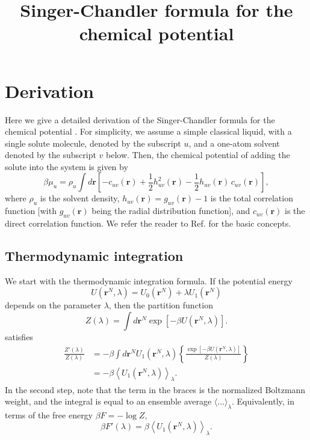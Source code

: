\documentclass{article}
\begin{document}
\newcommand{\vct}[1]{\mathbf{#1}}
\newcommand{\vr}{\vct{r}}
\newcommand{\vrN}{\mathbf{r}^N}
\newcommand{\vrn}{\mathbf{r}^n}
\newcommand{\plam}{\partial_\lambda}



\title{Singer-Chandler formula for the chemical potential}
\date{}
\maketitle



\section{Derivation}

Here we give a detailed derivation of the Singer-Chandler formula
  for the chemical potential \cite{singer}.
For simplicity, we assume a simple classical liquid,
  with a single solute molecule, denoted by the subscript $u$,
  and a one-atom solvent denoted by the subscript $v$ below.
Then, the chemical potential of adding the solute into
  the system is given by
%
\begin{equation}
\beta \mu_u
  =
  \rho_u \int d\vr
  \left[
    - c_{uv}(\vr)
    + \frac{1}{2} h_{uv}^2(\vr)
    - \frac{1}{2} h_{uv}(\vr) \, c_{uv}(\vr)
  \right],
  \label{eq:singer}
\end{equation}
%
where $\rho_u$ is the solvent density,
  $h_{uv}(\vr) = g_{uv}(\vr) - 1$ is the total correlation function
  [with $g_{uv}(\vr)$ being the radial distribution function],
and $c_{uv}(\vr)$ is the direct correlation function.
We refer the reader to Ref. \cite{hansen}
  for the basic concepts.
%



\subsection{Thermodynamic integration}

We start with the thermodynamic integration formula.
If the potential energy
\[
  U(\vrN, \lambda) = U_0(\vrN) + \lambda U_1(\vrN)
\]
depends on the parameter $\lambda$,
then the partition function
\[
  Z(\lambda) = \int d\vrN \exp[-\beta U(\vrN, \lambda)].
\]
satisfies
\begin{align*}
  \frac{ Z'(\lambda) }{Z(\lambda)}
  &=
    -\beta \int d\vrN U_1(\vrN, \lambda)
    \left\{
      \frac{ \exp
             \left[
             -\beta U(\vrN, \lambda)
             \right]}
      { Z(\lambda) }
    \right\} \\
  &=
    -\beta
    \left\langle
      U_1(\vrN, \lambda)
    \right\rangle_\lambda.
\end{align*}
In the second step, note that the term in the braces
  is the normalized Boltzmann weight,
  and the integral is equal to an ensemble average
  $\langle \dots \rangle_\lambda$.
%
Equivalently, in terms of the free energy $\beta F = -\log Z$,
\begin{equation}
  \beta F'(\lambda)
  = \beta
    \left\langle
      U_1(\vrN, \lambda)
    \right\rangle_\lambda.
\end{equation}
\end{document}
